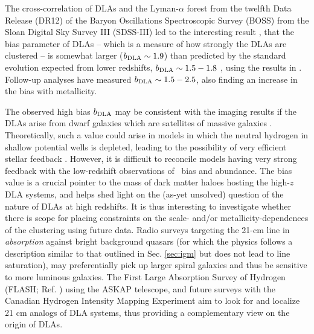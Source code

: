 The cross-correlation of DLAs and the Lyman-$\alpha$ forest from the  twelfth Data Release (DR12) of the Baryon Oscillations Spectroscopic Survey
(BOSS) from the Sloan Digital Sky Survey III (SDSS-III) led to the interesting result \cite{fontribera2012}, that the bias parameter of DLAs -- which is a measure of how strongly the DLAs are clustered  -- is somewhat larger ($b_{\rm DLA} \sim 1.9$) than predicted by the standard evolution expected from lower redshifts, $b_{\rm DLA} \sim 1.5-1.8$ \cite{hptrcar2016}, using the results in . Follow-up analyses \cite{perez2018} have measured $b_{\rm DLA} \sim 1.5-2.5$, also finding an increase in the bias with metallicity. 

 The observed high bias $b_{\rm DLA}$ may be consistent with the imaging results if the DLAs arise from dwarf galaxies which are satellites of massive galaxies \cite{fontribera2012}. Theoretically, such a value could arise in models in which the neutral hydrogen in shallow potential wells is depleted, leading to the possibility of very efficient stellar feedback \cite{barnes2014}. However, it is difficult to reconcile models having very strong feedback with the low-redshift observations of \HI\ bias and abundance. 
 The bias value is a crucial pointer to the mass of dark matter haloes hosting the high-$z$ DLA systems, and helps shed light on the (as-yet unsolved) question of the nature of DLAs at high redshifts. It is thus interesting to investigate whether there is scope for placing constraints on the scale- and/or metallicity-dependences \cite{digioia2020} of the clustering using future data. 
 Radio surveys targeting the 21-cm line in \textit{absorption} against bright background quasars (for which the physics follows a description similar to that outlined in Sec. \ref{sec:igm} but does not lead to line saturation), may preferentially pick up larger spiral galaxies and thus be sensitive to more luminous galaxies. The First Large Absorption Survey of Hydrogen (FLASH; Ref. \cite{allison2020}) using the ASKAP telescope, and future surveys with the Canadian Hydrogen Intensity Mapping Experiment \cite{yu2014} aim to look for and localize 21 cm analogs of DLA systems, thus providing a complementary view on the origin of DLAs.

